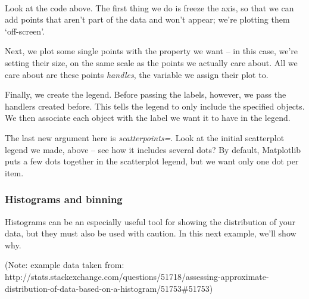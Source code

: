 \documentclass[11pt]{article}
\begin{document}
    \begin{center}
    \end{center}
    { \hspace*{\fill} \\}
    
    Look at the code above. The first thing we do is freeze the axis, so
that we can add points that aren't part of the data and won't appear;
we're plotting them `off-screen'.

Next, we plot some single points with the property we want -- in this
case, we're setting their size, on the same scale as the points we
actually care about. All we care about are these points \emph{handles},
the variable we assign their plot to.

Finally, we create the legend. Before passing the labels, however, we
pass the handlers created before. This tells the legend to only include
the specified objects. We then associate each object with the label we
want it to have in the legend.

The last new argument here is \emph{scatterpoints=}. Look at the initial
scatterplot legend we made, above -- see how it includes several dots?
By default, Matplotlib puts a few dots together in the scatterplot
legend, but we want only one dot per item.

    \hypertarget{histograms-and-binning}{%
\subsubsection{Histograms and binning}\label{histograms-and-binning}}

Histograms can be an especially useful tool for showing the distribution
of your data, but they must also be used with caution. In this next
example, we'll show why.

(Note: example data taken from:
http://stats.stackexchange.com/questions/51718/assessing-approximate-distribution-of-data-based-on-a-histogram/51753\#51753)
\end{document}
